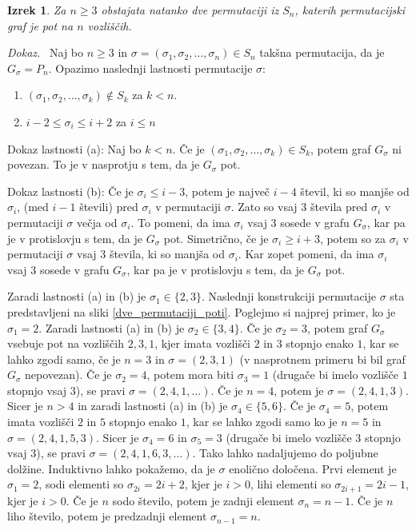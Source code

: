 \documentclass[a4paper, 12pt]{book}
\newtheorem{izrek}{Izrek}[chapter]
\newenvironment{dokaz}{\emph{Dokaz.}\ }{\hspace{\fill}{$\Box$}}
\begin{document}
\begin{izrek}
\label{izrek_dve_permutaciji_poti}
    Za $n \geq 3$ obstajata natanko dve permutaciji iz $S_n$, katerih permutacijski graf je pot na $n$ vozliščih.
\end{izrek}
\begin{dokaz}
    Naj bo $n \geq 3$ in $\sigma = (\sigma_1, \sigma_2,\dots, \sigma_n) \in S_n$ takšna permutacija, da je $G_{\sigma} = P_n$. Opazimo naslednji lastnosti permutacije $\sigma$:
    \begin{enumerate}[label=(\alph*)]
        \item $(\sigma_1, \sigma_2, \dots, \sigma_k) \notin S_k$ za $k < n$.
        \item $i-2 \leq \sigma_i \leq i+2$ za $i \leq n$
    \end{enumerate}
    
    Dokaz lastnosti (a): Naj bo $k < n$. Če je $(\sigma_1, \sigma_2, \dots, \sigma_k) \in S_k$, potem graf $G_{\sigma}$ ni povezan. To je v nasprotju s tem, da je $G_{\sigma}$ pot.
    
    Dokaz lastnosti (b): Če je $\sigma_i \leq i-3$, potem je največ $i-4$ števil, ki so manjše od $\sigma_i$, (med $i-1$ števili) pred $\sigma_i$ v permutaciji $\sigma$. Zato so vsaj 3 števila pred $\sigma_i$ v permutaciji $\sigma$ večja od $\sigma_i$. To pomeni, da ima $\sigma_i$ vsaj $3$ sosede v grafu $G_{\sigma}$, kar pa je v protislovju s tem, da je $G_{\sigma}$ pot. Simetrično, če je $\sigma_i \geq i+3$, potem so za $\sigma_i$ v permutaciji $\sigma$ vsaj 3 števila, ki so manjša od $\sigma_i$. Kar zopet pomeni, da ima $\sigma_i$ vsaj $3$ sosede v grafu $G_{\sigma}$, kar pa je v protislovju s tem, da je $G_{\sigma}$ pot.


    Zaradi lastnosti (a) in (b) je $\sigma_1 \in \{ 2, 3\}$.
    Naslednji konstrukciji permutacije $\sigma$ sta predstavljeni na sliki \ref{dve_permutaciji_poti}. 
    Poglejmo si najprej primer, ko je $\sigma_1 = 2$. Zaradi lastnosti (a) in (b) je $\sigma_2 \in \{ 3, 4 \}$. Če je $\sigma_2 = 3$, potem graf $G_{\sigma}$ vsebuje pot na vozliščih $2, 3, 1$, kjer imata vozlišči $2$ in $3$ stopnjo enako $1$, kar se lahko zgodi samo, če je $n = 3$ in $\sigma = (2, 3, 1)$ (v nasprotnem primeru bi bil graf $G_{\sigma}$ nepovezan). Če je $\sigma_2 = 4$, potem mora biti $\sigma_3 = 1$ (drugače bi imelo vozlišče $1$ stopnjo vsaj $3$), se pravi $\sigma = (2, 4, 1, \dots)$. Če je $n = 4$, potem je $\sigma = (2, 4, 1, 3)$. Sicer je $n > 4$ in zaradi lastnosti (a) in (b) je $\sigma_4 \in \{ 5, 6 \}$. Če je $\sigma_4 = 5$, potem imata vozlišči $2$ in $5$ stopnjo enako $1$, kar se lahko zgodi samo ko je $n = 5$ in $\sigma = (2, 4, 1, 5, 3)$. Sicer je $\sigma_4 = 6$ in $\sigma_5 = 3$ (drugače bi imelo vozlišče $3$ stopnjo vsaj $3$), se pravi $\sigma = (2, 4, 1, 6, 3,\dots)$. Tako lahko nadaljujemo do poljubne dolžine. Induktivno lahko pokažemo, da je $\sigma$ enolično določena. Prvi element je $\sigma_1 = 2$, sodi elementi so $\sigma_{2i} = 2i + 2$, kjer je $i > 0$, lihi elementi so $\sigma_{2i + 1} = 2i - 1$, kjer je $i > 0$. Če je $n$ sodo število, potem je zadnji element $\sigma_n = n-1$. Če je $n$ liho število, potem je predzadnji element $\sigma_{n-1} = n$. 
    

\end{dokaz}
\end{document}
